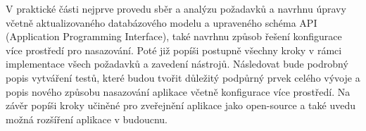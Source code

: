 V praktické části nejprve provedu sběr a analýzu požadavků a navrhnu úpravy včetně aktualizovaného databázového modelu a upraveného schéma API (Application Programming Interface), také navrhnu způsob řešení konfigurace více prostředí pro nasazování. Poté již popíši postupně všechny kroky v rámci implementace všech požadavků a zavedení nástrojů. Následovat bude podrobný popis vytváření testů, které budou tvořit důležitý podpůrný prvek celého vývoje a popis nového způsobu nasazování aplikace včetně konfigurace více prostředí. Na závěr popíši kroky učiněné pro zveřejnění aplikace jako open-source a také uvedu možná rozšíření aplikace v budoucnu.